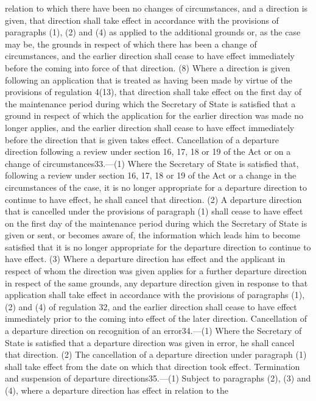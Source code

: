 \documentclass[a4paper]{article}
\begin{document}
relation to which there have been no changes of circumstances, and a direction
is given, that direction shall take effect in accordance with the provisions of
paragraphs (1), (2) and (4) as applied to the additional grounds or, as the case
may be, the grounds in respect of which there has been a change of
circumstances, and the earlier direction shall cease to have effect immediately
before the coming into force of that direction.
(8) Where a direction is given following an application that is treated as
having been made by virtue of the provisions of regulation 4(13), that direction
shall take effect on the first day of the maintenance period during which the
Secretary of State is satisfied that a ground in respect of which the
application for the earlier direction was made no longer applies, and the
earlier direction shall cease to have effect immediately before the direction
that is given takes effect.
Cancellation of a departure direction following a review under section 16, 17,
18 or 19 of the Act or on a change of circumstances33.—(1) Where the Secretary
of State is satisfied that, following a review under section 16, 17, 18 or 19 of
the Act or a change in the circumstances of the case, it is no longer
appropriate for a departure direction to continue to have effect, he shall
cancel that direction.
(2) A departure direction that is cancelled under the provisions of paragraph
(1) shall cease to have effect on the first day of the maintenance period during
which the Secretary of State is given or sent, or becomes aware of, the
information which leads him to become satisfied that it is no longer appropriate
for the departure direction to continue to have effect.
(3) Where a departure direction has effect and the applicant in respect of whom
the direction was given applies for a further departure direction in respect of
the same grounds, any departure direction given in response to that application
shall take effect in accordance with the provisions of paragraphs (1), (2) and
(4) of regulation 32, and the earlier direction shall cease to have effect
immediately prior to the coming into effect of the later direction.
Cancellation of a departure direction on recognition of an error34.—(1) Where
the Secretary of State is satisfied that a departure direction was given in
error, he shall cancel that direction.
(2) The cancellation of a departure direction under paragraph (1) shall take
effect from the date on which that direction took effect.
Termination and suspension of departure directions35.—(1) Subject to paragraphs
(2), (3) and (4), where a departure direction has effect in relation to the
\end{document}
